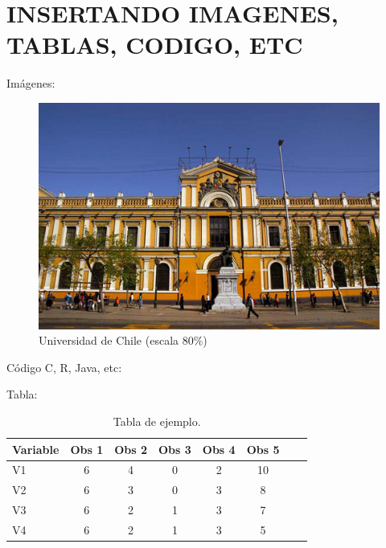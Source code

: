\cleardoublepage
\thispagestyle{empty}
\hbox{ }
\cleardoublepage

\appendix 

\section{INSERTANDO IMAGENES, TABLAS, CODIGO, ETC}

Im\'agenes:
\begin{figure}[h]
\centering
\includegraphics[scale=0.8]{figuras/uchile.jpg} 
\caption{\textsf{Universidad de Chile (escala 80\%)}}
\end{figure}

C\'odigo C, R, Java, etc:


\newpage

Tabla:

\begin{table}[h]
\centering
\begin{tabular}{l*{6}{c}r}
Variable              & Obs 1 & Obs 2 & Obs 3 & Obs 4 & Obs 5\\
\hline
V1 & 6 & 4 & 0 & 2 & 10 \\
V2            & 6 & 3 & 0 & 3 &  8 \\
V3           & 6 & 2 & 1 & 3 &  7 \\
V4     & 6 & 2 & 1 & 3 &  5 \\
\end{tabular}
    \caption{Tabla de ejemplo.}
\end{table}